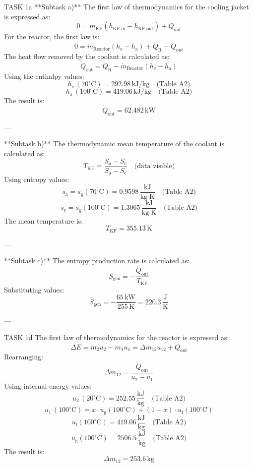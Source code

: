 TASK 1a  
**Subtask a)**  
The first law of thermodynamics for the cooling jacket is expressed as:  
\[
0 = \dot{m}_{\text{KF}} \left( h_{\text{KF,in}} - h_{\text{KF,out}} \right) + \dot{Q}_{\text{out}}
\]  
For the reactor, the first law is:  
\[
0 = \dot{m}_{\text{Reactor}} \left( h_{\text{e}} - h_{\text{a}} \right) + \dot{Q}_{\text{R}} - \dot{Q}_{\text{out}}
\]  
The heat flow removed by the coolant is calculated as:  
\[
\dot{Q}_{\text{out}} = \dot{Q}_{\text{R}} - \dot{m}_{\text{Reactor}} \left( h_{\text{e}} - h_{\text{a}} \right)
\]  
Using the enthalpy values:  
\[
h_{\text{e}} \, (70^\circ\text{C}) = 292.98 \, \text{kJ/kg} \quad \text{(Table A2)}
\]  
\[
h_{\text{a}} \, (100^\circ\text{C}) = 419.06 \, \text{kJ/kg} \quad \text{(Table A2)}
\]  
The result is:  
\[
\dot{Q}_{\text{out}} = 62.482 \, \text{kW}
\]  

---

**Subtask b)**  
The thermodynamic mean temperature of the coolant is calculated as:  
\[
T_{\text{KF}} = \frac{S_{\text{a}} - S_{\text{e}}}{S_{\text{a}} - S_{\text{e}}} \quad \text{(data visible)}
\]  
Using entropy values:  
\[
s_{\text{a}} = s_{\text{g}}(70^\circ\text{C}) = 0.9598 \, \frac{\text{kJ}}{\text{kg·K}} \quad \text{(Table A2)}
\]  
\[
s_{\text{e}} = s_{\text{g}}(100^\circ\text{C}) = 1.3065 \, \frac{\text{kJ}}{\text{kg·K}} \quad \text{(Table A2)}
\]  
The mean temperature is:  
\[
T_{\text{KF}} = 355.13 \, \text{K}
\]  

---

**Subtask c)**  
The entropy production rate is calculated as:  
\[
\dot{S}_{\text{gen}} = -\frac{\dot{Q}_{\text{out}}}{T_{\text{KF}}}
\]  
Substituting values:  
\[
\dot{S}_{\text{gen}} = -\frac{65 \, \text{kW}}{255 \, \text{K}} = 220.3 \, \frac{\text{J}}{\text{K}}
\]  

---

TASK 1d  
The first law of thermodynamics for the reactor is expressed as:  
\[
\Delta E = m_{2} u_{2} - m_{1} u_{1} = \Delta m_{12} u_{12} + \dot{Q}_{\text{out}}
\]  
Rearranging:  
\[
\Delta m_{12} = \frac{\dot{Q}_{\text{out}}}{u_{2} - u_{1}}
\]  
Using internal energy values:  
\[
u_{2} \, (20^\circ\text{C}) = 252.55 \, \frac{\text{kJ}}{\text{kg}} \quad \text{(Table A2)}
\]  
\[
u_{1} \, (100^\circ\text{C}) = x \cdot u_{\text{g}}(100^\circ\text{C}) + (1-x) \cdot u_{\text{f}}(100^\circ\text{C})
\]  
\[
u_{\text{f}}(100^\circ\text{C}) = 419.06 \, \frac{\text{kJ}}{\text{kg}} \quad \text{(Table A2)}
\]  
\[
u_{\text{g}}(100^\circ\text{C}) = 2506.5 \, \frac{\text{kJ}}{\text{kg}} \quad \text{(Table A2)}
\]  
The result is:  
\[
\Delta m_{12} = 253.6 \, \text{kg}
\]  

